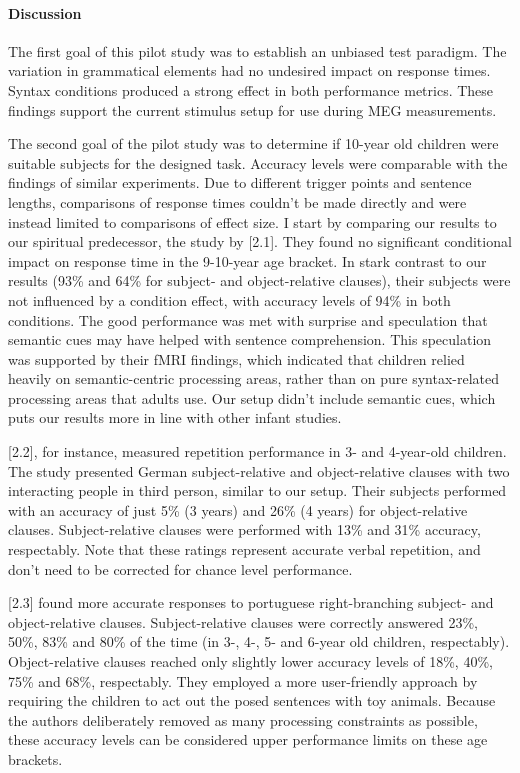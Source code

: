 \paragraph{Discussion}

The first goal of this pilot study was to establish an unbiased test paradigm.
The variation in grammatical elements had no undesired impact on response times.
Syntax conditions produced a strong effect in both performance metrics.
These findings support the current stimulus setup for use during MEG measurements.


The second goal of the pilot study was to determine if 10-year old children were suitable subjects for the designed task.
Accuracy levels were comparable with the findings of similar experiments.
Due to different trigger points and sentence lengths, comparisons of response times couldn't be made directly and were instead limited to comparisons of effect size.
I start by comparing our results to our spiritual predecessor, the study by [2.1].
They found no significant conditional impact on response time in the 9-10-year age bracket.
In stark contrast to our results (93\% and 64\% for subject- and object-relative clauses), their subjects were not influenced by a condition effect, with accuracy levels of 94\% in both conditions.
The good performance was met with surprise and speculation that semantic cues may have helped with sentence comprehension.
This speculation was supported by their fMRI findings, which indicated that children relied heavily on semantic-centric processing areas, rather than on pure syntax-related processing areas that adults use.
Our setup didn't include semantic cues, which puts our results more in line with other infant studies.

[2.2], for instance, measured repetition performance in 3- and 4-year-old children.
The study presented German subject-relative and object-relative clauses with two interacting people in third person, similar to our setup.
Their subjects performed with an accuracy of just 5\% (3 years) and 26\% (4 years) for object-relative clauses.
Subject-relative clauses were performed with 13\% and 31\% accuracy, respectably.
Note that these ratings represent accurate verbal repetition, and don't need to be corrected for chance level performance.

[2.3] found more accurate responses to portuguese right-branching subject- and object-relative clauses.
Subject-relative clauses were correctly answered 23\%, 50\%, 83\% and 80\% of the time (in 3-, 4-, 5- and 6-year old children, respectably).
Object-relative clauses reached only slightly lower accuracy levels of 18\%, 40\%, 75\% and 68\%, respectably.
They employed a more user-friendly approach by requiring the children to act out the posed sentences with toy animals.
Because the authors deliberately removed as many processing constraints as possible, these accuracy levels can be considered upper performance limits on these age brackets.

